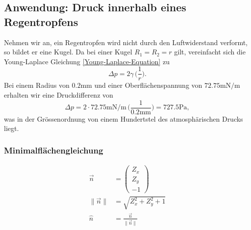 \begin{refsection}
\subsection{Anwendung: Druck innerhalb eines Regentropfens}
%
Nehmen wir an, ein Regentropfen wird nicht durch den Luftwiderstand verformt, so bildet er eine Kugel. Da bei einer Kugel $R_1=R_2=r$ gilt, vereinfacht sich die Young-Laplace Gleichung \ref{Young-Laplace-Equation} zu
\begin{equation}
\Delta p = 2\gamma \, \bigg(\frac{1}{r}\bigg).
\end{equation}
Bei einem Radius von $0.2\text{mm}$ und einer Oberflächenspannung von $72.75 \text{mN}/\text{m}$ erhalten wir eine Druckdifferenz von
\begin{equation}
\Delta p = 2 \cdot 72.75 \text{mN}/\text{m} \, \bigg(\frac{1}{0.2\text{mm}}\bigg)= 727.5 \text{Pa},
\end{equation}
was in der Grössenordnung von einem Hundertstel des atmosphärischen Drucks liegt. 


\iffalse
\subsubsection{Minimalflächengleichung}\label{MFG}
\begin{equation}
\begin{split}
\vec{n} &= \begin{pmatrix}Z_x \\ Z_y \\ -1\end{pmatrix} \\
\|\vec{n}\| &= \sqrt{Z_x^2+Z_y^2+1} \\
\hat{n} &= \frac{\vec{n}}{\|\vec{n}\|} \\
\end{split}
\end{equation}


\end{refsection}
